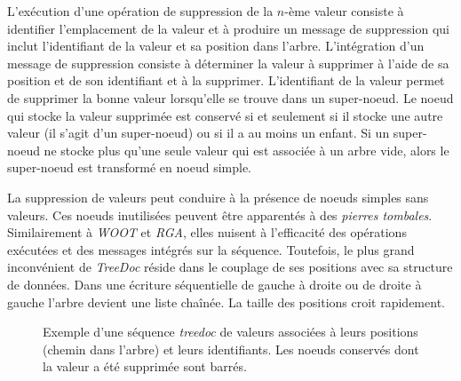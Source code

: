 L'exécution d'une opération de suppression de la $n$-ème valeur consiste à identifier l'emplacement de la valeur et à produire un message de suppression qui inclut l'identifiant de la valeur et sa position dans l'arbre.
L'intégration d'un message de suppression consiste à déterminer la valeur à supprimer à l'aide de sa position et de son identifiant et à la supprimer.
L'identifiant de la valeur permet de supprimer la bonne valeur lorsqu'elle se trouve dans un super-noeud.
Le noeud qui stocke la valeur supprimée est conservé si et seulement si il stocke une autre valeur (il s'agit d'un super-noeud) ou si il a au moins un enfant.
Si un super-noeud ne stocke plus qu'une seule valeur qui est associée à un arbre vide, alors le super-noeud est transformé en noeud simple.

La suppression de valeurs peut conduire à la présence de noeuds simples sans valeurs.
Ces noeuds inutilisées peuvent être apparentés à des \emph{pierres tombales}.
Similairement à \emph{WOOT} et \emph{RGA}, elles nuisent à l'efficacité des opérations exécutées et des messages intégrés sur la séquence.
Toutefois, le plus grand inconvénient de \emph{TreeDoc} réside dans le couplage de ses positions avec sa structure de données.
Dans une écriture séquentielle de gauche à droite ou de droite à gauche l'arbre devient une liste chaînée.
La taille des positions croit rapidement.

\begin{figure}[tb]
\centering
{}
\caption[Exemple d'une séquence \emph{treedoc}]{Exemple d'une séquence \emph{treedoc} de valeurs associées à leurs positions (chemin dans l'arbre) et leurs identifiants.
Les noeuds conservés dont la valeur a été supprimée sont barrés.}\label{fig:treedoc}
\end{figure}

